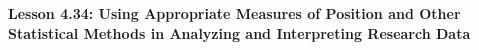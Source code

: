 \begin{center}
\textbf{Lesson 4.34: Using Appropriate Measures of Position and Other Statistical Methods in Analyzing and Interpreting Research Data}
\end{center}

\vspace*{-1.5ex}

